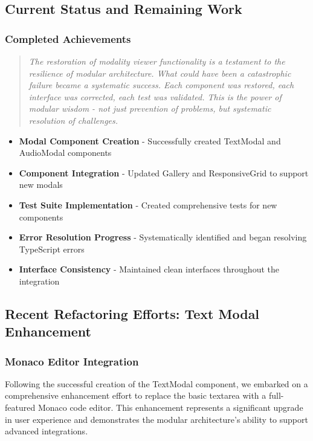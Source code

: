 \documentclass[11pt]{article}
\begin{document}
\subsection{Current Status and Remaining Work}

\subsubsection{Completed Achievements}

\begin{quote}
\emph{The restoration of modality viewer functionality is a testament to the resilience of modular architecture. What could have been a catastrophic failure became a systematic success. Each component was restored, each interface was corrected, each test was validated. This is the power of modular wisdom - not just prevention of problems, but systematic resolution of challenges.}
\end{quote}

\begin{itemize}
\item \textbf{Modal Component Creation} - Successfully created TextModal and AudioModal components
\item \textbf{Component Integration} - Updated Gallery and ResponsiveGrid to support new modals
\item \textbf{Test Suite Implementation} - Created comprehensive tests for new components
\item \textbf{Error Resolution Progress} - Systematically identified and began resolving TypeScript errors
\item \textbf{Interface Consistency} - Maintained clean interfaces throughout the integration
\end{itemize}

\subsection{Recent Refactoring Efforts: Text Modal Enhancement}

\subsubsection{Monaco Editor Integration}

Following the successful creation of the TextModal component, we embarked on a comprehensive enhancement effort to replace the basic textarea with a full-featured Monaco code editor. This enhancement represents a significant upgrade in user experience and demonstrates the modular architecture's ability to support advanced integrations.
\end{document}
